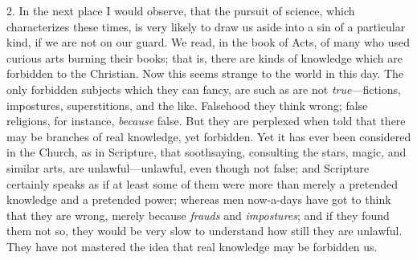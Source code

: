2. In the next place I would observe, that the pursuit of science,
which characterizes these times, is very likely to draw us aside into
a sin of a particular kind, if we are not on our guard. We read, in
the book of Acts, of many who used curious arts burning their books;
that is, there are kinds of knowledge which are forbidden to the
Christian. Now this seems strange to the world in this day. The only
forbidden subjects which they can fancy, are such as are not \emph{true}—fictions,
impostures, superstitions, and the like. Falsehood they think wrong;
false religions, for instance, \emph{because} false. But they are
perplexed when told that there may be branches of real knowledge, yet
forbidden. Yet it has ever been considered in the Church, as in
Scripture, that soothsaying, consulting the stars, magic, and similar
arts, are unlawful—unlawful, even though not false; and Scripture
certainly speaks as if at least some of them were more than merely a
pretended knowledge and a pretended power; whereas men now-a-days have
got to think that they are wrong, merely because \emph{frauds} and \emph{impostures};
and if they found them not so, they would be very slow to understand
how still they are unlawful. They have not mastered the idea that real
knowledge may be forbidden us.

